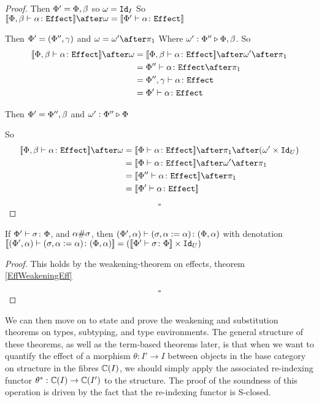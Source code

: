 \documentclass{Report}
\begin{document}
\begin{proof}
    \subcase{$\w=\i$}
    Then $\Phi' = \Phi,\beta$ so $\omega=\texttt{Id}_{I}$
    So $\deno{\typerelation{\P,\b}{\a}{\effect}}\after\w = \deno{\typerelation{\P'}{\a}{\effect}}$
    
    Then $\Phi' = (\Phi'',\gamma)$ and $\w=\w'\after\p$
    Where $\omega' : \Phi'' \triangleright \Phi,\beta$.
    So
    \begin{align}
        \deno{\typerelation{\P,\b}{\a}{\effect}}\after\w & = \deno{\typerelation{\P,\b}{\a}{\effect}}\after\w'\after\p\\
        & = {\typerelation{\P''}{\a}{\effect}}\after\p\\
        & = {\typerelation{\P'',\g}{\a}{\effect}}\\
        & = {\typerelation{\P'}{\a}{\effect}}\\
    \end{align}
    
    Then $\Phi'=\Phi'',\beta$ and $\omega' : \Phi'' \triangleright \Phi$
    
    So \begin{align}
        \deno{\typerelation{\P,\b}{\a}{\effect}}\after\w &= \deno{\typerelation{\P}{\a}{\effect}}\after\p\after(\w'\times\Id{U})\\
        &=\deno{\typerelation{\P}{\a}{\effect}}\after\w'\after\p\\
        & = \deno{\typerelation{\P''}{\a}{\effect}}\after\p\\
        & = \deno{\typerelation{\P'}{\a}{\effect}}\\
    \end{align}

    $$\square$$
\end{proof}

\begin{lemma}
    If $\Phi' \vdash \sigma \colon \Phi$, and $\alpha\#\sigma$, then $(\Phi', \alpha) \vdash (\sigma, \alpha:=\alpha) \colon (\Phi,\alpha)$ with denotation ${\bf [\![}(\Phi', \alpha) \vdash (\sigma, \alpha:=\alpha) \colon (\Phi,\alpha){\bf ]\!]} = ({\bf [\![}\Phi' \vdash \sigma \colon \Phi{\bf ]\!]}\times\texttt{Id}_{U})$
\end{lemma}
\begin{proof}
   This holds by the weakening-theorem on effects, theorem \ref{EffWeakeningEff}

   $$\square$$
\end{proof}



We can then move on to state and prove the weakening and substitution theorems on types, subtyping, and type environments. The general structure of these theorems, as well as the term-based theorems later, is that when we want to quantify the effect of a morphism $\theta: I' \rightarrow I$ between objects in the base category on structure in the fibres $\mathbb{C}(I)$, we should simply apply the associated re-indexing functor $\theta^*: \mathbb{C}(I) \rightarrow \mathbb{C}(I')$ to the structure. The proof of the soundness of this operation is driven by the fact that the re-indexing functor is S-closed.
\end{document}
